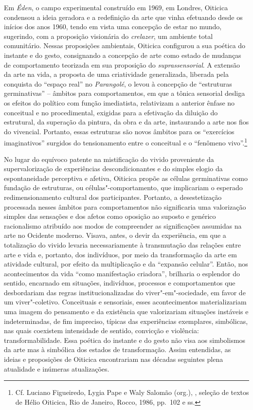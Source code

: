 Em \emph{Éden}, o campo experimental construído em 1969, em Londres,
Oiticica condensou a ideia geradora e a redefinição da arte que vinha
efetuando desde os inícios dos anos 1960, tendo em vista uma concepção
de estar no mundo, sugerindo, com a proposição visionária do
\emph{crelazer}, um ambiente total comunitário. Nessas proposições
ambientais, Oiticica configurou a sua poética do instante e do gesto,
consignando a concepção de arte como estado de mudanças de comportamento
teorizada em sua proposição do \emph{suprassensorial}. A extensão da
arte na vida, a proposta de uma criatividade generalizada, liberada pela
conquista do ``espaço real'' no \emph{Parangolé}, o levou à concepção de
``estruturas germinativas'' -- âmbitos para comportamentos, em que a
tônica sensorial desliga os efeitos do político com função imediatista,
relativizam a anterior ênfase no conceitual e no procedimental, exigidas
para a efetivação da diluição do estrutural, da superação da pintura, da
obra e da arte, instaurando a arte nos fios do vivencial. Portanto,
essas estruturas são novos âmbitos para os ``exercícios imaginativos''
surgidos do tensionamento entre o conceitual e o ``fenômeno
vivo''.\footnote{Cf. Luciano Figueiredo, Lygia Pape e Waly Salomão
(org.), {}, seleção de textos de Hélio
Oiticica, Rio de Janeiro, Rocco, 1986, pp.~102 e ss.}

No lugar do equívoco patente na mistificação do vivido proveniente da
supervalorização de experiências descondicionantes e do simples elogio
da espontaneidade perceptiva e afetiva, Oiticica propõe as células
germinativas como fundação de estruturas, ou células"-comportamento, que
implicariam o esperado redimensionamento cultural dos participantes.
Portanto, a desestetização processada nesses âmbitos para comportamentos
não significaria uma valorização simples das sensações e dos afetos como
oposição ao suposto e genérico racionalismo atribuído aos modos de
compreender as significações assumidas na arte no Ocidente moderno.
Visava, antes, o devir da experiência, em que a totalização do vivido
levaria necessariamente à transmutação das relações entre arte e vida e,
portanto, dos indivíduos, por meio da transformação da arte em atividade
cultural, por efeito da multiplicação e da ``expansão celular''. Então,
nos acontecimentos da vida ``como manifestação criadora'', brilharia o
esplendor do sentido, encarnado em situações, indivíduos, processos e
comportamentos que desbordariam das regras institucionalizadas do
viver"-em"-sociedade, em favor de um viver"-coletivo. Conceituais e
sensoriais, esses acontecimentos materializariam uma imagem do
pensamento e da existência que valorizariam situações instáveis e
indeterminadas, de fim impreciso, típicas das experiências exemplares,
simbólicas, nas quais coexistem intensidade de sentido, convicção e
violência: transformabilidade. Essa poética do instante e do gesto não
visa aos simbolismos da arte mas à simbólica dos estados de
transformação. Assim entendidas, as ideias e proposições de Oiticica
encontrariam nas décadas seguintes plena atualidade e inúmeras
atualizações.

